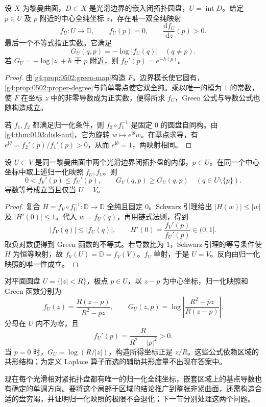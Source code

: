 \begin{theorem}
	\label{g4:thm:0502:bordered-disk}
	设 \(X\) 为黎曼曲面，\(D\subset X\) 是光滑边界的嵌入闭拓扑圆盘，\(U=\operatorname{int}D\)。给定 \(p\in U\) 及 \(p\) 附近的中心全纯坐标 \(z\)，存在唯一双全纯映射
	\[
		f_U:U\longrightarrow\mathbb D,
		\qquad f_U(p)=0,\qquad
		\frac{\mathrm{d}f_U}{\mathrm{d}z}(p)>0.
	\]
	最后一个不等式指正实数。它满足
	\[
		G_U(q,p)=-\log|f_U(q)|\quad(q\ne p).
	\]
	若 \(G_U=-\log|z|+h\) 于 \(p\) 附近，则 \(f_U'(p)=e^{-h(p)}\)。
\end{theorem}
\begin{proof}
	由\cref{g4:prop:0502:green-map}构造 \(F\)。边界模长使它固有，\cref{g4:prop:0502:proper-degree}与简单零点使它双全纯。乘以唯一的模为 \(1\) 的常数，使 \(F\) 在坐标 \(z\) 中的非零导数成为正实数，便得所求 \(f_U\)，Green 公式与导数公式也随构造成立。

	若 \(f_1,f_2\) 都满足归一化条件，则 \(f_2\circ f_1^{-1}\) 是固定 \(0\) 的圆盘自同构。由\cref{g4:thm:0103:disk-aut}，它为旋转 \(w\mapsto e^{\mathrm{i}\theta}w\)。在基点求导，有 \(e^{\mathrm{i}\theta}=f_2'(p)/f_1'(p)>0\)，从而 \(e^{\mathrm{i}\theta}=1\)，两映射相同。
\end{proof}

\begin{corollary}
	\label{g4:cor:0502:domain-monotonicity}
	设 \(U\subset V\) 是同一黎曼曲面中两个光滑边界闭拓扑盘的内部，\(p\in U\)。在同一个中心坐标中取上述归一化映照 \(f_U,f_V\)。则
	\[
		0<f_V'(p)\le f_U'(p),\qquad
		G_V(q,p)\ge G_U(q,p)\quad(q\in U\setminus\{p\}).
	\]
	导数等号成立当且仅当 \(U=V\)。
\end{corollary}
\begin{proof}
	复合 \(H=f_V\circ f_U^{-1}:\mathbb D\to\mathbb D\) 全纯且固定 \(0\)。Schwarz 引理给出 \(|H(w)|\le|w|\) 及 \(|H'(0)|\le1\)。代入 \(w=f_U(q)\)，再用链式法则，得到
	\[
		|f_V(q)|\le|f_U(q)|,\qquad
		H'(0)=\frac{f_V'(p)}{f_U'(p)}\in(0,1].
	\]
	取负对数便得到 Green 函数的不等式。若导数比为 \(1\)，Schwarz 引理的等号条件使 \(H\) 为恒等映射，故 \(f_V(U)=\mathbb D=f_V(V)\)。\(f_V\) 单射，于是 \(U=V\)。反向由归一化映照的唯一性成立。
\end{proof}

\begin{example}
	\label{g4:exm:0502:disk-green}
	对平面圆盘 \(U=\{|z|<R\}\)，极点 \(p\in U\)，以 \(z-p\) 为中心坐标，归一化映照和 Green 函数分别为
	\[
		f_U(z)=\frac{R(z-p)}{R^2-\overline pz},\qquad
		G_U(z,p)=\log\left|\frac{R^2-\overline pz}{R(z-p)}\right|.
	\]
	分母在 \(U\) 内不为零，且
	\[
		f_U'(p)=\frac{R}{R^2-|p|^2}>0.
	\]
	当 \(p=0\) 时，\(G_U=\log(R/|z|)\)，构造所得坐标正是 \(z/R\)。这些公式依赖区域的共形结构；为定义 Laplace 算子而选的辅助共形度量不出现在答案中。
\end{example}

现在每个光滑相对紧拓扑盘都有唯一的归一化全纯坐标，嵌套区域上的基点导数也有确定的单调方向。要将这个局部于区域的结论推广到整张非紧曲面，还需构造合适的盘穷竭，并证明归一化映照的极限不会退化；下一节分别处理这两个问题。
